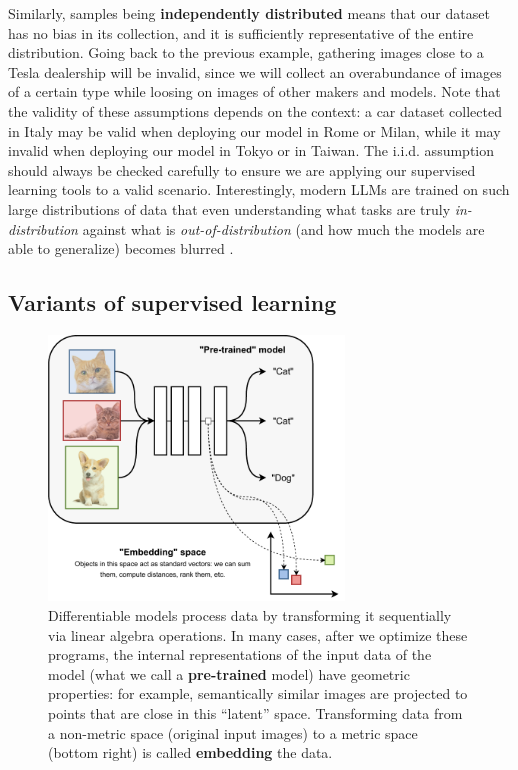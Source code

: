 Similarly, samples being \textbf{independently distributed} means that our dataset has no bias in its collection, and it is sufficiently representative of the entire distribution. Going back to the previous example, gathering images close to a Tesla dealership will be invalid, since we will collect an overabundance of images of a certain type while loosing on images of other makers and models. Note that the validity of these assumptions depends on the context: a car dataset collected in Italy may be valid when deploying our model in Rome or Milan, while it may invalid when deploying our model in Tokyo or in Taiwan. The i.i.d. assumption should always be checked carefully to ensure we are applying our supervised learning tools to a valid scenario. Interestingly, modern LLMs are trained on such large distributions of data that even understanding what tasks are truly \textit{in-distribution} against what is \textit{out-of-distribution} (and how much the models are able to generalize) becomes blurred \cite{yuan2024revisiting}.

\subsection{Variants of supervised learning}
\label{subsec:variants_supervised_learning}

\begin{figure}[t]
    \centering
    \includegraphics[width=0.7\textwidth]{images/embedding.pdf}
    \caption{Differentiable models process data by transforming it sequentially via linear algebra operations. In many cases, after we optimize these programs, the internal representations of the input data of the model (what we call a \textbf{pre-trained} model) have geometric properties: for example, semantically similar images are projected to points that are close in this “latent” space. Transforming data from a non-metric space (original input images) to a metric space (bottom right) is called \textbf{embedding} the data.}
    \label{fig:embedding}
\end{figure}


